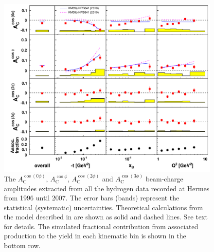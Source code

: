 \begin{figure}
  \begin{center}
    \includegraphics[width=15cm]{bcaplots_eml_par13_bin6_all_release_pic_update_withassoc}
    \caption{The $A_{\textrm{C}}^{\cos(0\phi)}$, $A_{\textrm{C}}^{\cos\phi}$, $A_{\textrm{C}}^{\cos(2\phi)}$ and $A_{\textrm{C}}^{\cos(3\phi)}$ beam-charge  amplitudes extracted from all the hydrogen data recorded at H{\sc ermes} from 1996 until 2007. The error bars (bands) represent the statistical (systematic) uncertainties.  Theoretical calculations from the model described in \cite{Kum09} are shown as solid and dashed lines. See text for details. The simulated fractional contribution from associated production to the yield in each kinematic bin is shown in the bottom row.}
  \label{bca_xbjrange}
 \end{center}
\end{figure}

